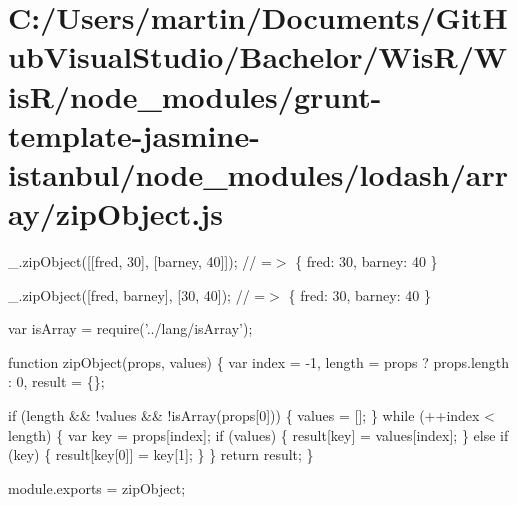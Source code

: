 \hypertarget{_c_1_2_users_2martin_2_documents_2_git_hub_visual_studio_2_bachelor_2_wis_r_2_wis_r_2node_module4d2efefa184cd5623f6f2e30a4641b2f}{}\section{C\+:/\+Users/martin/\+Documents/\+Git\+Hub\+Visual\+Studio/\+Bachelor/\+Wis\+R/\+Wis\+R/node\+\_\+modules/grunt-\/template-\/jasmine-\/istanbul/node\+\_\+modules/lodash/array/zip\+Object.\+js}
\+\_\+.\+zip\+Object(\mbox{[}\mbox{[}\textquotesingle{}fred\textquotesingle{}, 30\mbox{]}, \mbox{[}\textquotesingle{}barney\textquotesingle{}, 40\mbox{]}\mbox{]}); // =$>$ \{ \textquotesingle{}fred\textquotesingle{}\+: 30, \textquotesingle{}barney\textquotesingle{}\+: 40 \}

\+\_\+.\+zip\+Object(\mbox{[}\textquotesingle{}fred\textquotesingle{}, \textquotesingle{}barney\textquotesingle{}\mbox{]}, \mbox{[}30, 40\mbox{]}); // =$>$ \{ \textquotesingle{}fred\textquotesingle{}\+: 30, \textquotesingle{}barney\textquotesingle{}\+: 40 \}


\begin{DoxyCodeInclude}
var isArray = require(\textcolor{stringliteral}{'../lang/isArray'});

\textcolor{keyword}{function} zipObject(props, values) \{
  var index = -1,
      length = props ? props.length : 0,
      result = \{\};

  \textcolor{keywordflow}{if} (length && !values && !isArray(props[0])) \{
    values = [];
  \}
  \textcolor{keywordflow}{while} (++index < length) \{
    var key = props[index];
    \textcolor{keywordflow}{if} (values) \{
      result[key] = values[index];
    \} \textcolor{keywordflow}{else} \textcolor{keywordflow}{if} (key) \{
      result[key[0]] = key[1];
    \}
  \}
  \textcolor{keywordflow}{return} result;
\}

module.exports = zipObject;
\end{DoxyCodeInclude}
 